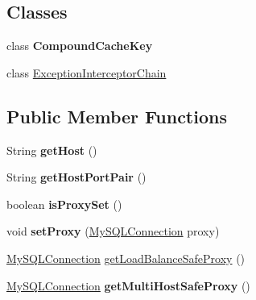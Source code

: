\subsection*{Classes}
\begin{DoxyCompactItemize}
\item 
class {\bfseries Compound\+Cache\+Key}
\item 
class \mbox{\hyperlink{classcom_1_1mysql_1_1jdbc_1_1_connection_impl_1_1_exception_interceptor_chain}{Exception\+Interceptor\+Chain}}
\end{DoxyCompactItemize}
\subsection*{Public Member Functions}
\begin{DoxyCompactItemize}
\item 
\mbox{\label{classcom_1_1mysql_1_1jdbc_1_1_connection_impl_a321bf86db434af4dc61e48e4e3d4a6ad}} 
String {\bfseries get\+Host} ()
\item 
\mbox{\label{classcom_1_1mysql_1_1jdbc_1_1_connection_impl_aaf98d7970c9f42a8f3b41def414126a8}} 
String {\bfseries get\+Host\+Port\+Pair} ()
\item 
\mbox{\label{classcom_1_1mysql_1_1jdbc_1_1_connection_impl_a859c2075ee4be70b588c0cd7b9fe382a}} 
boolean {\bfseries is\+Proxy\+Set} ()
\item 
\mbox{\label{classcom_1_1mysql_1_1jdbc_1_1_connection_impl_a55160e37c34da8e8a0c68337a6a9d08c}} 
void {\bfseries set\+Proxy} (\mbox{\hyperlink{interfacecom_1_1mysql_1_1jdbc_1_1_my_s_q_l_connection}{My\+S\+Q\+L\+Connection}} proxy)
\item 
\mbox{\hyperlink{interfacecom_1_1mysql_1_1jdbc_1_1_my_s_q_l_connection}{My\+S\+Q\+L\+Connection}} \mbox{\hyperlink{classcom_1_1mysql_1_1jdbc_1_1_connection_impl_ae9ce7aa6699cd62451e72acd02f46a42}{get\+Load\+Balance\+Safe\+Proxy}} ()
\item 
\mbox{\label{classcom_1_1mysql_1_1jdbc_1_1_connection_impl_a88a52349f1b437c03f3ca480d06703d5}} 
\mbox{\hyperlink{interfacecom_1_1mysql_1_1jdbc_1_1_my_s_q_l_connection}{My\+S\+Q\+L\+Connection}} {\bfseries get\+Multi\+Host\+Safe\+Proxy} ()

\end{DoxyCompactItemize}
